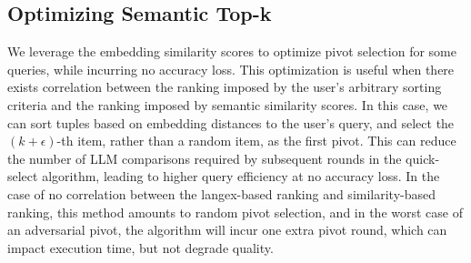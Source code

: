 \subsection{Optimizing Semantic Top-k}
We leverage the embedding similarity scores to optimize pivot selection for some queries, while incurring no accuracy loss. This optimization is useful when there exists correlation between the ranking imposed by the user's arbitrary sorting criteria and the ranking imposed by semantic similarity scores. In this case, we can sort tuples based on embedding distances to the user's query, and select the $(k + \epsilon)$-th item, rather than a random item, as the first pivot. This can reduce the number of LLM comparisons required by subsequent rounds in the quick-select algorithm, leading to higher query efficiency at no accuracy loss. In the case of no correlation between the langex-based ranking and similarity-based ranking, this method amounts to random pivot selection, and in the worst case of an adversarial pivot, the algorithm will incur one extra pivot round, which can impact execution time, but not degrade quality.






